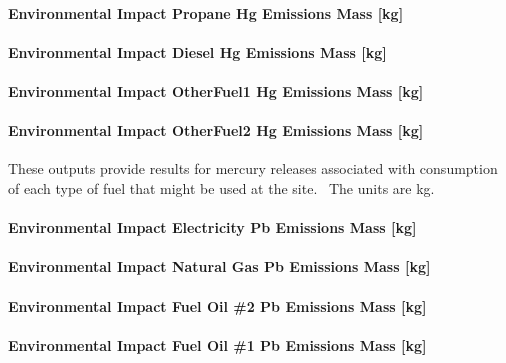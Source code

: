 \paragraph{Environmental Impact Propane Hg Emissions Mass {[}kg{]}}\label{environmental-impact-propane-hg-emissions-mass-kg}

\paragraph{Environmental Impact Diesel Hg Emissions Mass {[}kg{]}}\label{environmental-impact-diesel-hg-emissions-mass-kg}

\paragraph{Environmental Impact OtherFuel1 Hg Emissions Mass {[}kg{]}}\label{environmental-impact-otherfuel1-hg-emissions-mass-kg}

\paragraph{Environmental Impact OtherFuel2 Hg Emissions Mass {[}kg{]}}\label{environmental-impact-otherfuel2-hg-emissions-mass-kg}

These outputs provide results for mercury releases associated with consumption of each type of fuel that might be used at the site.~ The units are kg.

\paragraph{Environmental Impact Electricity Pb Emissions Mass {[}kg{]}}\label{environmental-impact-electricity-pb-emissions-mass-kg}

\paragraph{Environmental Impact Natural Gas Pb Emissions Mass {[}kg{]}}\label{environmental-impact-natural-gas-pb-emissions-mass-kg}

\paragraph{Environmental Impact Fuel Oil \#2 Pb Emissions Mass {[}kg{]}}\label{environmental-impact-fuel-oil-2-pb-emissions-mass-kg}

\paragraph{Environmental Impact Fuel Oil \#1 Pb Emissions Mass {[}kg{]}}\label{environmental-impact-fuel-oil-1-pb-emissions-mass-kg}

